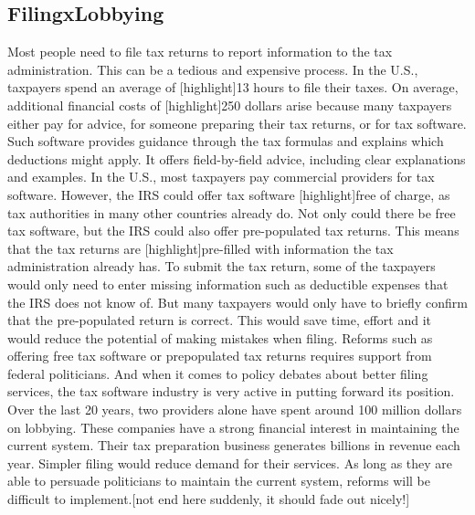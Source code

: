 \documentclass[11pt]{article}
\begin{document}
\subsection{FilingxLobbying}
Most people need to file tax returns to report information to the tax administration. This can be a tedious and expensive process. In the U.S., taxpayers spend an average of [highlight]13 hours to file their taxes. On average, additional financial costs of [highlight]250 dollars arise because many taxpayers either pay for advice, for someone preparing their tax returns, or for tax software. Such software provides guidance through the tax formulas and explains which deductions might apply. It offers field-by-field advice, including clear explanations and examples. 
In the U.S., most taxpayers pay commercial providers for tax software. However, the IRS could offer tax software [highlight]free of charge, as tax authorities in many other countries already do. Not only could there be free tax software, but the IRS could also offer pre-populated tax returns. This means that the tax returns are [highlight]pre-filled with information the tax administration already has. To submit the tax return, some of the taxpayers would only need to enter missing information such as deductible expenses that the IRS does not know of. But many taxpayers would only have to briefly confirm that the pre-populated return is correct. This would save time, effort and it would reduce the potential of making mistakes when filing.
Reforms such as offering free tax software or prepopulated tax returns requires support from federal politicians. And when it comes to policy debates about better filing services, the tax software industry is very active in putting forward its position. Over the last 20 years, two providers alone have spent around 100 million dollars on lobbying. These companies have a strong financial interest in maintaining the current system. Their tax preparation business generates billions in revenue each year. Simpler filing would reduce demand for their services. As long as they are able to persuade politicians to maintain the current system, reforms will be difficult to implement.[not end here suddenly, it should fade out nicely!]
\end{document}
